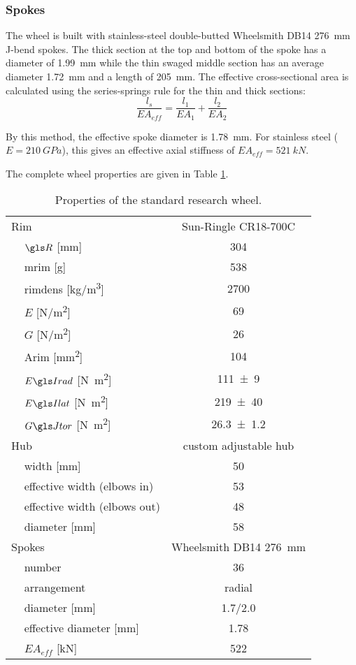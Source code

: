 \documentclass[../../thesis.tex]{subfiles}
\begin{document}
\subsubsection*{Spokes}
The wheel is built with stainless-steel double-butted Wheelsmith DB14 \SI{276}{mm} J-bend spokes. The thick section at the top and bottom of the spoke has a diameter of \SI{1.99}{mm} while the thin swaged middle section has an average diameter \SI{1.72}{mm} and a length of \SI{205}{mm}. The effective cross-sectional area is calculated using the series-springs rule for the thin and thick sections:
\begin{equation}
\frac{l_s}{EA_{eff}} = \frac{l_1}{EA_1} + \frac{l_2}{EA_2}
\end{equation}

By this method, the effective spoke diameter is \SI{1.78}{mm}. For stainless steel ($E = \SI{210}{GPa}$), this gives an effective axial stiffness of $EA_{eff} = \SI{521}{kN}$.

The complete wheel properties are given in Table \ref{tab:std_research_wheel}.

\begin{table}
\caption{Properties of the standard research wheel.}
\label{tab:std_research_wheel}
\begin{tabular}{llc}
\hline
\multicolumn{2}{l}{Rim}& Sun-Ringle CR18-700C\\
\,& $\R$ [\si{mm}]         & \num{304}\\
\,& \gls{mrim} [\si{g}]    & \num{538}\\
\,& \gls{rimdens} [\si{kg/m^3}] & \num{2700}\\
\,& $E$ [\si{N/m^2}]       & \num{69}\\
\,& $G$ [\si{N/m^2}]       & \num{26}\\
\,& \gls{Arim} [\si{mm^2}] & \num{104}\\
\,& $\EIr$ [\si{N.m^2}]    & \num{111+-9}\\
\,& $\EIl$ [\si{N.m^2}]    & \num{219+-40}\\
\,& $\GJ$   [\si{N.m^2}]   & \num{26.3+-1.2}\\
\multicolumn{2}{l}{Hub}    & custom adjustable hub\\
\,& width [\si{mm}]        & 50\\
\,& effective width (elbows in) & 53\\
\,& effective width (elbows out) & 48\\
\,& diameter [\si{mm}]     & 58\\
\multicolumn{2}{l}{Spokes} & Wheelsmith DB14 \SI{276}{mm}\\
\,& number                 & 36\\
\,& arrangement            & radial\\
\,& diameter [\si{mm}]     & 1.7/2.0\\
\,& effective diameter [\si{mm}] & 1.78\\
\,& $EA_{eff}$ [\si{kN}]   & 522\\
\hline
\end{tabular}
\end{table}
\end{document}
